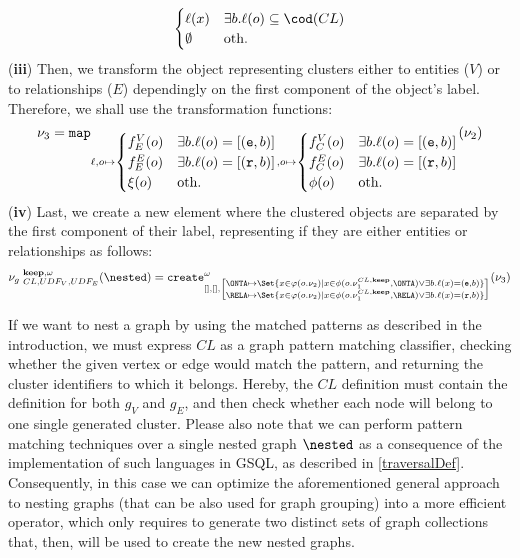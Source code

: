 \begin{definition}
\[\begin{cases}
\ell(x) & \exists b. \ell(o)\subseteq \cod(CL)\\
\emptyset & \textup{oth.}\\
\end{cases}\]
(\textbf{iii}) Then, we transform the object representing clusters either to entities ($V$) or to relationships ($E$) dependingly on the first component of the object's label. Therefore, we shall use the transformation functions:
\[\nu_3=\texttt{map}_{\ell,o\mapsto\begin{cases}
	 f_E^V(o) & \exists b. \ell(o)=[(\texttt{e},b)]\\
	 f_E^E(o) & \exists b. \ell(o)=[(\texttt{r},b)]\\
	 \xi(o) & \textup{oth.}\\
	\end{cases},o\mapsto\begin{cases}
	f_C^V(o) & \exists b. \ell(o)=[(\texttt{e},b)]\\
	f_C^E(o) & \exists b. \ell(o)=[(\texttt{r},b)]\\
	\phi(o) & \textup{oth.}\\
	\end{cases}}(\nu_2)\]
(\textbf{iv}) Last, we create a new element where the clustered objects are separated by the first component of their label, representing if they are either entities or relationships as follows:
\[{\nu_g\;}^{\textbf{keep},\omega}_{CL,UDF_V,UDF_E}(\nested)=\texttt{create}_{[],[],\left[\substack{\ONTA\mapsto \Set{x\in\varphi(o.\nu_2)|x\in \phi(o.\nu_1^{CL,\textbf{keep}},\ONTA)\vee\exists b. \ell(x)=(\texttt{e},b)}\\ \RELA\mapsto \Set{x\in\varphi(o.\nu_2)|x\in \phi(o.\nu_1^{CL,\textbf{keep}},\RELA)\vee\exists b. \ell(x)=(\texttt{r},b)}}\right]}^\omega(\nu_3)\]

\end{definition}

If we want to nest a graph by using the matched patterns as described in the introduction, we must express $CL$ as a graph pattern matching classifier, checking whether the given vertex or edge would match the pattern, and returning the cluster identifiers to which it belongs. Hereby, the $CL$ definition must contain the definition for both $g_V$ and $g_E$, and then check whether each node will belong to one single generated cluster. Please also note that we can perform  pattern matching techniques over a single nested graph $\nested$ as a consequence of the implementation of such languages in GSQL, as described in \vref{traversalDef}. Consequently, in this case we can optimize the aforementioned general approach to nesting graphs (that can be also used for graph grouping) into a more efficient operator, which only requires to generate two distinct sets of graph collections that, then, will be used to create the new nested graphs. %

